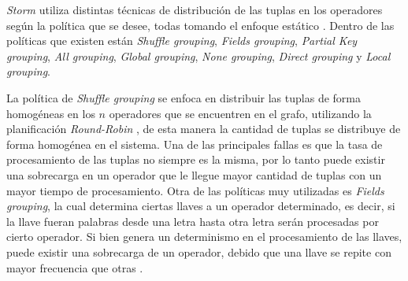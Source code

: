 
\textsl{Storm} utiliza distintas técnicas de distribución de las tuplas en los operadores según la política que se desee, todas tomando el enfoque estático \citep{stormtwitter}. Dentro de las políticas que existen están \textit{Shuffle grouping}, \textit{Fields grouping}, \textit{Partial Key grouping}, \textit{All grouping}, \textit{Global grouping}, \textit{None grouping}, \textit{Direct grouping} y \textit{Local grouping}.

La política de \textit{Shuffle grouping} se enfoca en distribuir las tuplas de forma homogéneas en los $n$ operadores que se encuentren en el grafo, utilizando la planificación \textit{Round-Robin} \citep{bookScheduling}, de esta manera la cantidad de tuplas se distribuye de forma homogénea en el sistema. Una de las principales fallas es que la tasa de procesamiento de las tuplas no siempre es la misma, por lo tanto puede existir una sobrecarga en un operador que le llegue mayor cantidad de tuplas con un mayor tiempo de procesamiento. Otra de las políticas muy utilizadas es \textit{Fields grouping}, la cual determina ciertas llaves a un operador determinado, es decir, si la llave fueran palabras desde una letra hasta otra letra serán procesadas por cierto operador. Si bien genera un determinismo en el procesamiento de las llaves, puede existir una sobrecarga de un operador, debido que una llave se repite con mayor frecuencia que otras \citep{bookstorm}.


